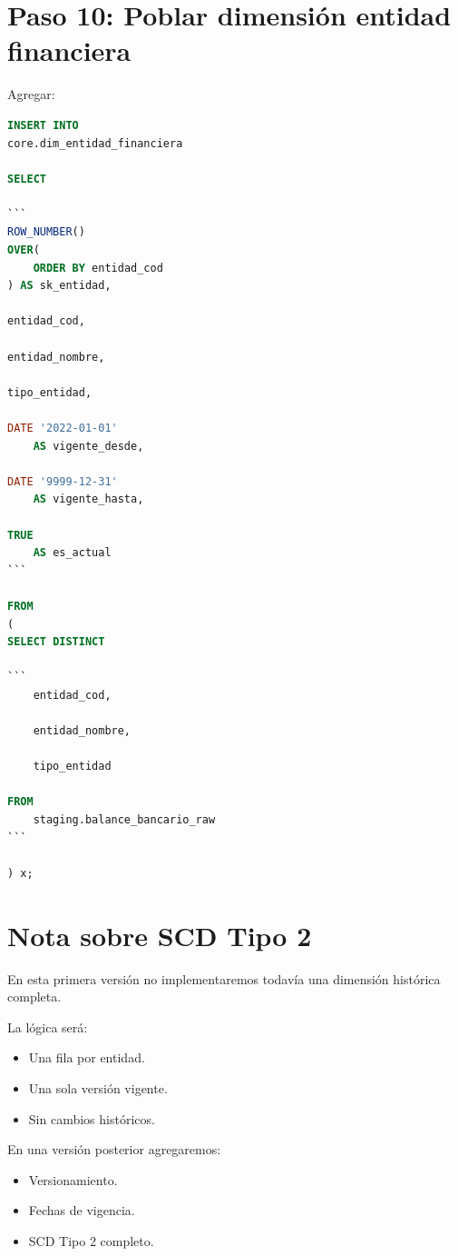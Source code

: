 \section{Paso 10: Poblar dimensión entidad financiera}

Agregar:

\begin{lstlisting}[language=SQL]
INSERT INTO
core.dim_entidad_financiera

SELECT

```
ROW_NUMBER()
OVER(
    ORDER BY entidad_cod
) AS sk_entidad,

entidad_cod,

entidad_nombre,

tipo_entidad,

DATE '2022-01-01'
    AS vigente_desde,

DATE '9999-12-31'
    AS vigente_hasta,

TRUE
    AS es_actual
```

FROM
(
SELECT DISTINCT

```
    entidad_cod,

    entidad_nombre,

    tipo_entidad

FROM
    staging.balance_bancario_raw
```

) x;
\end{lstlisting}

\section{Nota sobre SCD Tipo 2}

En esta primera versión no implementaremos todavía una dimensión histórica completa.

La lógica será:

\begin{itemize}
\item Una fila por entidad.
\item Una sola versión vigente.
\item Sin cambios históricos.
\end{itemize}

En una versión posterior agregaremos:

\begin{itemize}
\item Versionamiento.
\item Fechas de vigencia.
\item SCD Tipo 2 completo.
\end{itemize}

